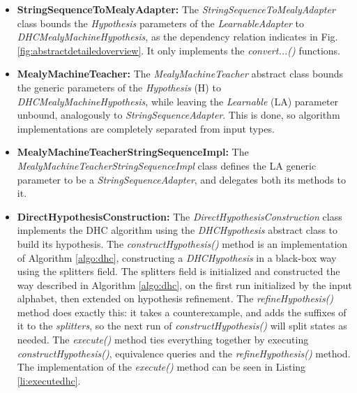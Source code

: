 \begin{itemize}
	\item \textbf{StringSequenceToMealyAdapter:} The \emph{StringSequenceToMealyAdapter} class bounds the \emph{Hypothesis} parameters of the \emph{LearnableAdapter} to \emph{DHCMealyMachineHypothesis}, as the dependency relation indicates in Fig. \ref{fig:abstractdetailedoverview}. It only implements the \emph{convert...()} functions.

	\item \textbf{MealyMachineTeacher:} The \emph{MealyMachineTeacher} abstract class bounds the generic parameters of the \emph{Hypothesis} (H) to \emph{DHCMealyMachineHypothesis}, while leaving the \emph{Learnable} (LA) parameter unbound, analogously to \emph{StringSequenceAdapter}. This is done, so algorithm implementations are completely separated from input types. 
	\item \textbf{MealyMachineTeacherStringSequenceImpl:} The \emph{MealyMachineTeacherStringSequenceImpl} class defines the LA generic parameter to be a \emph{StringSequenceAdapter}, and delegates both its methods to it.
	 
	\item \textbf{DirectHypothesisConstruction:} The \emph{DirectHypothesisConstruction} class implements the DHC algorithm using the \emph{DHCHypothesis} abstract class to build its hypothesis. The \emph{constructHypothesis()} method is an implementation of Algorithm \ref{algo:dhc}, constructing a \emph{DHCHypothesis} in a black-box way using the splitters field. The splitters field is initialized and constructed the way described in Algorithm \ref{algo:dhc}, on the first run initialized by the input alphabet, then extended on hypothesis refinement. The \emph{refineHypothesis()} method does exactly this: it takes a counterexample, and adds the suffixes of it to the \emph{splitters}, so the next run of \emph{constructHypothesis()} will split states as needed. The \emph{execute()} method ties everything together by executing \emph{constructHypothesis()}, equivalence queries and the \emph{refineHypothesis()} method. The implementation of the \emph{execute()} method can be seen in Listing \ref{li:executedhc}.\\

	
	\begin{figure}[H]
		\centering


\end{figure}
\end{itemize}
